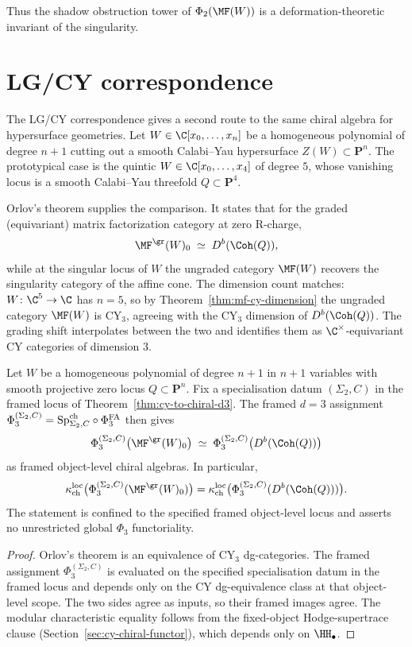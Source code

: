 Thus the shadow obstruction tower of $\Phi_2(\MF(W))$ is a deformation-theoretic invariant of the singularity.

\section{LG/CY correspondence}
\label{sec:lg-cy-correspondence}

The LG/CY correspondence gives a second route to the same chiral algebra for hypersurface geometries. Let $W \in \C[x_0, \ldots, x_n]$ be a homogeneous polynomial of degree $n + 1$ cutting out a smooth Calabi--Yau hypersurface $Z(W) \subset \mathbf{P}^n$. The prototypical case is the quintic $W \in \C[x_0, \ldots, x_4]$ of degree $5$, whose vanishing locus is a smooth Calabi--Yau threefold $Q \subset \mathbf{P}^4$.

Orlov's theorem \cite{Orlov2004} supplies the comparison. It states that for the graded (equivariant) matrix factorization category at zero R-charge,
\[
 \MF^{\gr}(W)_{0} \;\simeq\; D^b(\Coh(Q)) ,
\]
while at the singular locus of $W$ the ungraded category $\MF(W)$ recovers the singularity category of the affine cone. The dimension count matches: $W \colon \C^5 \to \C$ has $n = 5$, so by Theorem~\ref{thm:mf-cy-dimension} the ungraded category $\MF(W)$ is CY$_3$, agreeing with the CY$_3$ dimension of $D^b(\Coh(Q))$. The grading shift interpolates between the two and identifies them as $\C^\times$-equivariant CY categories of dimension $3$.

\begin{proposition}
\label{prop:lg-cy-matching}
Let $W$ be a homogeneous polynomial of degree $n + 1$ in $n + 1$ variables with smooth projective zero locus $Q \subset \mathbf{P}^n$. Fix a specialisation datum $(\Sigma_2,C)$ in the framed locus of Theorem~\ref{thm:cy-to-chiral-d3}. The framed $d = 3$ assignment
$\Phi_3^{(\Sigma_2,C)}=\mathrm{Sp}^{\mathrm{ch}}_{\Sigma_2,C}\circ\Phi^{\mathrm{FA}}_3$ then gives
\[
 \Phi_3^{(\Sigma_2,C)}\bigl(\MF^{\gr}(W)_{0}\bigr) \;\simeq\; \Phi_3^{(\Sigma_2,C)}\bigl(D^b(\Coh(Q))\bigr)
\]
as framed object-level chiral algebras. In particular,
\[
\kappa_{\mathrm{ch}}^{\mathrm{loc}}\bigl(\Phi_3^{(\Sigma_2,C)}(\MF^{\gr}(W)_0)\bigr)
=
\kappa_{\mathrm{ch}}^{\mathrm{loc}}\bigl(\Phi_3^{(\Sigma_2,C)}(D^b(\Coh(Q)))\bigr).
\]
The statement is confined to the specified framed object-level locus and asserts no unrestricted global $\Phi_3$ functoriality.
\end{proposition}

\begin{proof}
Orlov's theorem is an equivalence of CY$_3$ dg-categories. The framed assignment $\Phi_3^{(\Sigma_2,C)}$ is evaluated on the specified specialisation datum in the framed locus and depends only on the CY dg-equivalence class at that object-level scope. The two sides agree as inputs, so their framed images agree. The modular characteristic equality follows from the fixed-object Hodge-supertrace clause (Section~\ref{sec:cy-chiral-functor}), which depends only on $\HH_\bullet$.
\end{proof}


